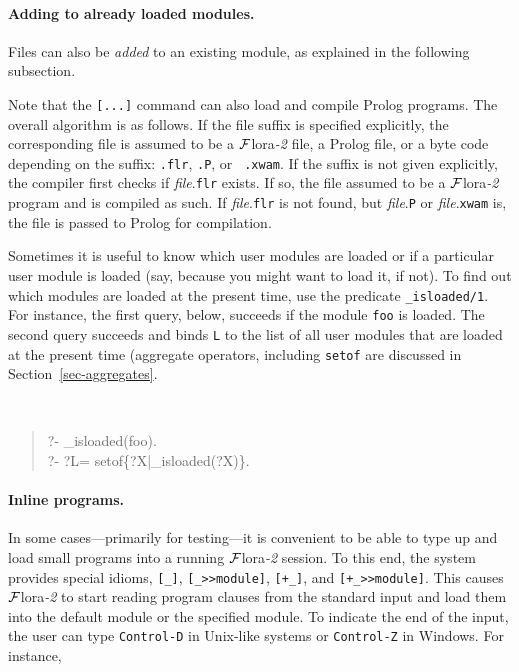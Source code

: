 \documentclass[11pt]{article}
\newcommand{\FLORA}{{\mbox{\sc ${\cal F}${lora}\rm\emph{-2}}}\xspace}
\newcommand{\ofile}{xwam}
\begin{document}
\paragraph{Adding to already loaded modules.}
Files can also be \emph{added} to an existing module, as explained in the
following subsection. 

Note that the {\tt [...]} command can also load and compile Prolog programs.
The overall algorithm is as follows. If the file suffix is specified
explicitly, the corresponding file is assumed to be a \FLORA file, a Prolog
file, or a byte code depending on the suffix: {\tt .flr}, {\tt .P}, or {\tt
  .\ofile}. If the suffix is not given explicitly, the compiler first checks if
{\it file}.{\tt flr} exists. If so, the file assumed to be a \FLORA program
and is compiled as such. If {\it file}.{\tt flr} is not found, but {\it
  file}.{\tt P} or {\it file}.{\tt xwam} is, the file is passed to Prolog for
compilation.


Sometimes it is useful to know which user modules are loaded or if a
particular user module is loaded (say, because you might want to load it,
if not).  To find out which modules are loaded at the present time, use the
predicate {\tt \_isloaded/1}. For instance, the first query,
below, succeeds if the module {\tt foo} is loaded. The second query
succeeds and binds {\tt L} to the list of all user modules that are loaded
at the present time (aggregate operators, including {\tt setof} are
discussed in Section~\ref{sec-aggregates}.
{\tt
\begin{quote}
 ?- \_isloaded(foo).\\
 ?- ?L= setof\{?X|\_isloaded(?X)\}.
\end{quote}
}

\paragraph{Inline programs.}
In some cases---primarily for testing---it is convenient to be able to type
up and load small programs into a running \FLORA session.
To this end, the system provides special idioms, \verb|[_]|,
\verb|[_>>module]|, \verb|[+_]|, and \verb|[+_>>module]|. This causes \FLORA to start reading program clauses
from the standard input and load them into the default module or the
specified module. To indicate the end of the input, the user can type
{\tt Control-D} in Unix-like systems or {\tt Control-Z} in Windows.  
For instance,
\end{document}
